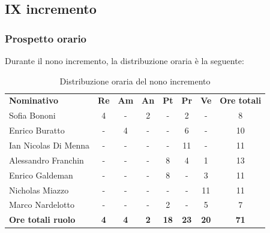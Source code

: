 \documentclass[../piano-di-progetto.tex]{subfiles}
\begin{document}
  \subsection{IX incremento}

  \subsubsection{Prospetto orario}
 Durante il nono incremento, la distribuzione oraria è la seguente:
  \begin{table}[H]
    \centering
    \begin{tabular}{lccccccc}
    \rowcolor{lightgray}
    \textbf{Nominativo}       & \textbf{Re} & \textbf{Am} & \textbf{An} & \textbf{Pt} & \textbf{Pr} & \textbf{Ve} & \textbf{Ore totali} \\
Sofia Bononi              & 4           & -           & 2           & -           & 2           & -           & 8                   \\
Enrico Buratto            & -           & 4           & -           & -           & 6           & -           & 10                  \\
Ian Nicolas Di Menna      & -           & -           & -           & -           & 11          & -           & 11                  \\
Alessandro Franchin       & -           & -           & -           & 8           & 4           & 1           & 13                  \\
Enrico Galdeman           & -           & -           & -           & 8           & -           & 3           & 11                  \\
Nicholas Miazzo           & -           & -           & -           & -           & -           & 11          & 11                  \\
Marco Nardelotto          & -           & -           & -           & 2           & -           & 5           & 7                   \\
\textbf{Ore totali ruolo} & \textbf{4}  & \textbf{4}  & \textbf{2}  & \textbf{18} & \textbf{23} & \textbf{20} & \textbf{71}    
    
    \end{tabular}
    \caption{Distribuzione oraria del nono incremento}
  \end{table}
\end{document}
